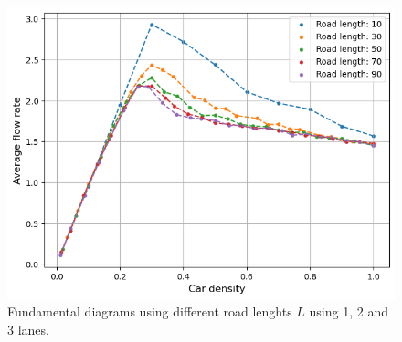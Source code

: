 \documentclass[a4paper,12pt]{article}
\begin{document}
\begin{figure}[H]
\begin{minipage}{.5\textwidth}
    \end{minipage}
    \centering
    \begin{minipage}{.5\textwidth}
        \centering
        \includegraphics[scale=0.47]{Images/fundamental diagrams 3 lanes.png}
    \end{minipage}%
    \caption{Fundamental diagrams using different road lenghts $L$ using 1, 2 and 3 lanes.}
    \label{flowrate}
\end{figure}
\end{document}
